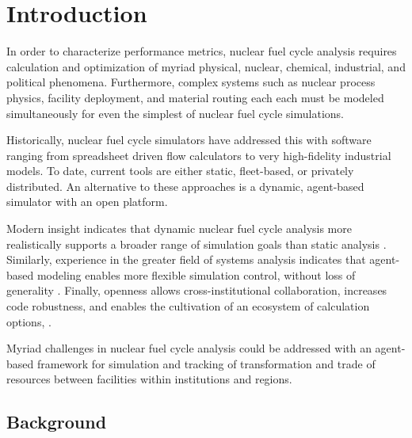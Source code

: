 
\section{Introduction}


In order to characterize performance metrics, nuclear fuel cycle analysis 
requires calculation and optimization of myriad physical, nuclear, chemical, 
industrial, and political phenomena. Furthermore, complex systems such as 
nuclear process physics, facility deployment, and material routing each each 
must be modeled simultaneously for even the simplest of nuclear fuel cycle 
simulations. 

Historically, nuclear fuel cycle simulators have addressed this with software 
ranging from spreadsheet driven flow calculators to very high-fidelity 
industrial models. To date, current tools are either static, fleet-based, or 
privately distributed. An alternative to these approaches is a dynamic, 
agent-based simulator with an open platform. 

Modern insight indicates that dynamic nuclear fuel cycle analysis more 
realistically supports a broader range of simulation goals than static analysis 
\cite{piet_dynamic_2011}. Similarly, experience in the greater field of systems 
analysis indicates that agent-based modeling enables more flexible simulation 
control, without loss of generality \cite{thatpapermattsent}. Finally, 
openness allows cross-institutional collaboration, increases code robustness, 
and enables the cultivation of an ecosystem of calculation options, 
\cite{softwarecarpentryresource}.  

Myriad challenges in nuclear fuel cycle analysis could be 
addressed with an agent-based framework for simulation and tracking of 
transformation and trade of resources between facilities within institutions 
and regions.  

\subsection{Background}


